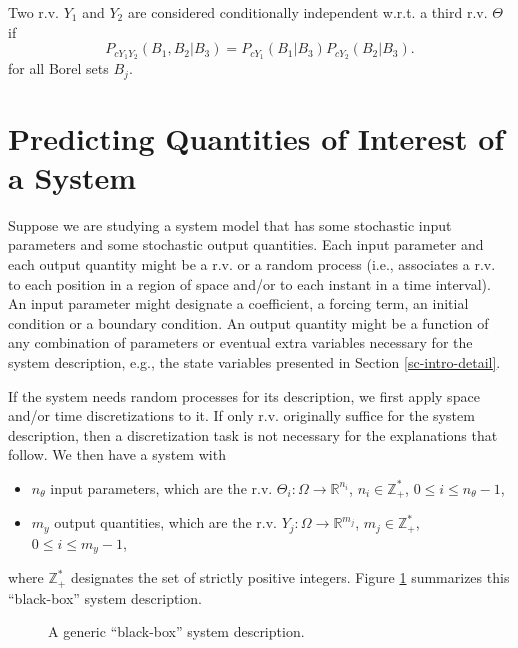 Two r.v. $Y_1$ and $Y_2$ are considered conditionally independent w.r.t. a third r.v. $\Theta$ if
\begin{equation*}
P_{cY_1Y_2}(B_1,B_2|B_3) = P_{cY_1}(B_1|B_3)P_{cY_2}(B_2|B_3).
\end{equation*}
for all Borel sets $B_j$.

\section{Predicting Quantities of Interest of a System}\label{sc-intro-qoi}

Suppose we are studying a system model that has
some stochastic input parameters and some stochastic output quantities.
Each input parameter and each output quantity might be a r.v. or a random process
(i.e., associates a r.v. to each position in a region of space and/or to each instant in a time interval).
An input parameter might designate a coefficient, a forcing term, an initial condition or a boundary condition.
An output quantity might be a function of any combination of parameters or eventual extra variables necessary for the system description, e.g.,
the state variables presented in Section \ref{sc-intro-detail}.

If the system needs random processes for its description, we first apply space and/or time discretizations to it. 
If only r.v. originally suffice for the system description, then a discretization task is not necessary for the explanations that follow.
We then have a system with
\begin{itemize}
\item $n_{\theta}$ input parameters, which are the r.v. $\Theta_i:\Omega\rightarrow\mathbb{R}^{n_i}$, $n_i\in\mathbb{Z}_+^*$, $0\leqslant i\leqslant n_{\theta}-1$,
\item $m_{y}$ output quantities, which are the r.v. $Y_j:\Omega\rightarrow\mathbb{R}^{m_j}$, $m_j\in\mathbb{Z}_+^*$, $0\leqslant i\leqslant m_{y}-1$,
\end{itemize}
where $\mathbb{Z}_+^*$ designates the set of strictly positive integers.
Figure \ref{fig-black-box} summarizes this ``black-box'' system description.

\begin{figure}[h]
\caption{A generic ``black-box'' system description.}
\label{fig-black-box}
\end{figure}

